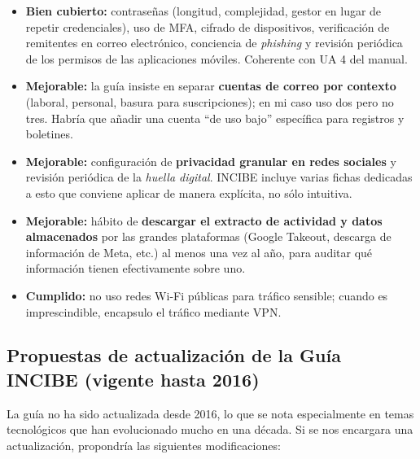 \begin{itemize}[leftmargin=*]
    \item \textbf{Bien cubierto:} contraseñas (longitud, complejidad, gestor en lugar de repetir credenciales), uso de MFA, cifrado de dispositivos, verificación de remitentes en correo electrónico, conciencia de \textit{phishing} y revisión periódica de los permisos de las aplicaciones móviles. Coherente con UA 4 del manual.
    \item \textbf{Mejorable:} la guía insiste en separar \textbf{cuentas de correo por contexto} (laboral, personal, basura para suscripciones); en mi caso uso dos pero no tres. Habría que añadir una cuenta ``de uso bajo'' específica para registros y boletines.
    \item \textbf{Mejorable:} configuración de \textbf{privacidad granular en redes sociales} y revisión periódica de la \textit{huella digital}. INCIBE incluye varias fichas dedicadas a esto que conviene aplicar de manera explícita, no sólo intuitiva.
    \item \textbf{Mejorable:} hábito de \textbf{descargar el extracto de actividad y datos almacenados} por las grandes plataformas (Google Takeout, descarga de información de Meta, etc.) al menos una vez al año, para auditar qué información tienen efectivamente sobre uno.
    \item \textbf{Cumplido:} no uso redes Wi-Fi públicas para tráfico sensible; cuando es imprescindible, encapsulo el tráfico mediante VPN.
\end{itemize}

\subsection{Propuestas de actualización de la Guía INCIBE (vigente hasta 2016)}

La guía no ha sido actualizada desde 2016, lo que se nota especialmente en temas tecnológicos que han evolucionado mucho en una década. Si se nos encargara una actualización, propondría las siguientes modificaciones:


